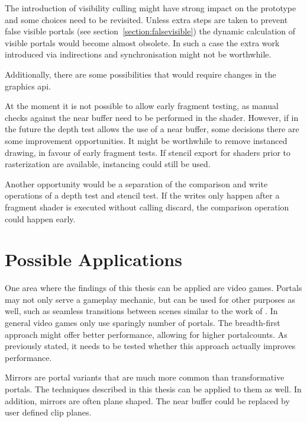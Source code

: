 The introduction of visibility culling might have strong impact on the prototype and some choices need to be revisited. Unless extra steps are taken to prevent false visible portals (see section~\ref{section:falsevisible}) the dynamic calculation of visible portals would become almost obsolete. In such a case the extra work introduced via indirections and synchronisation might not be worthwhile.

Additionally, there are some possibilities that would require changes in the graphics \gls{api}.

At the moment it is not possible to allow early fragment testing, as manual checks against the near buffer need to be performed in the shader. However, if in the future the depth test allows the use of a near buffer, some decisions there are some improvement opportunities. It might be worthwhile to remove instanced drawing, in favour of early fragment tests. If stencil export for shaders prior to rasterization are available, instancing could still be used.

Another opportunity would be a separation of the comparison and write operations of a depth test and stencil test. If the writes only happen after a fragment shader is executed without calling discard, the comparison operation could happen early.

\section{Possible Applications}
One area where the findings of this thesis can be applied are video games. Portals may not only serve a gameplay mechanic, but can be used for other purposes as well, such as seamless transitions between scenes similar to the work of \textcite{schmalstieg:1999:sewing}. In general video games only use sparingly number of portals. The breadth-first approach might offer better performance, allowing for higher \glspl{portalcount}. As previously stated, it needs to be tested whether this approach actually improves performance.

Mirrors are portal variants that are much more common than transformative portals. The techniques described in this thesis can be applied to them as well. In addition, mirrors are often plane shaped. The near buffer could be replaced by user defined clip planes.


